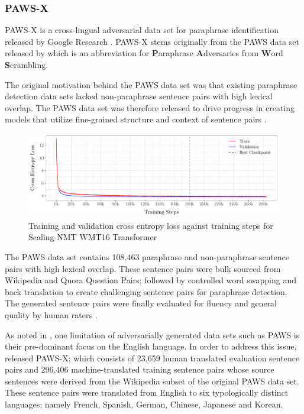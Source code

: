 \documentclass[11pt,a4paper]{article}
\begin{document}
\subsubsection{PAWS-X}

PAWS-X is a cross-lingual adversarial data set for paraphrase identification released by Google Research \citep{pawsx2019emnlp}. PAWS-X stems originally from the PAWS data set released by \citet{zhang2019paws} which is an abbreviation for \textbf{P}araphrase \textbf{A}dversaries from \textbf{W}ord \textbf{S}crambling.

The original motivation behind the PAWS data set was that existing paraphrase detection data sets lacked non-paraphrase sentence pairs with high lexical overlap. The PAWS data set was therefore released to drive progress in creating models that utilize fine-grained structure and context of sentence pairs \cite{zhang2019paws}. 

\begin{figure}
  \centering 
  \includegraphics[trim={0cm 0cm 0cm 0cm},clip,width=\textwidth]{transformer_nmt_evolution.pdf}
  \caption{Training and validation cross entropy loss against training steps for Scaling NMT WMT16 Transformer}
  \label{transformer_nmt_evolution}
\end{figure}

The PAWS data set contains 108,463 paraphrase and non-paraphrase sentence pairs with high lexical overlap. These sentence pairs were bulk sourced from Wikipedia and Quora Question Pairs; followed by controlled word swapping and back translation to create challenging sentence pairs for paraphrase detection. The generated sentence pairs were finally evaluated for fluency and general quality by human raters \cite{zhang2019paws}.

As noted in \citet{pawsx2019emnlp}, one limitation of adversarially generated data sets such as PAWS is their pre-dominant focus on the English language. In order to address this issue, \citet{pawsx2019emnlp} released PAWS-X; which consists of 23,659 human translated evaluation sentence pairs and 296,406 machine-translated training sentence pairs whose source sentences were derived from the Wikipedia subset of the original PAWS data set. These sentence pairs were translated from English to six typologically distinct languages; namely French, Spanish, German, Chinese, Japanese and Korean.
\end{document}
